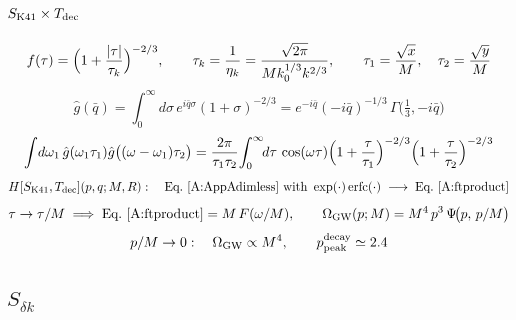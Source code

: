 \documentclass[10pt,prd,aps,nobibnotes,superscriptaddress,preprintnumbers,notitlepage]{revtex4-1}
\newcommand{\Omgw}{\Omega_{\rm GW}}
\begin{document}
\subsection{\texorpdfstring{$S_{\rm K41}\times T_{\rm dec}$}{S\_K41 x T\_dec}}
\label{sec:chain-k41dec}

\begin{equation}
  f(\tau)=\Bigl(1+\frac{|\tau|}{\tau_k}\Bigr)^{-2/3},
  \qquad
  \tau_k=\frac{1}{\eta_k}=\frac{\sqrt{2\pi}}{M k_0^{1/3}k^{2/3}},
  \qquad
  \tau_1=\frac{\sqrt{x}}{M},\quad \tau_2=\frac{\sqrt{y}}{M}
  \label{A:decf}
\end{equation}
\begin{equation}
  \hat g(\bar q)=\!\int_0^{\infty}\!\!d\sigma\,e^{i\bar q\sigma}(1+\sigma)^{-2/3}
  =e^{-i\bar q}(-i\bar q)^{-1/3}\,\Gamma\!\bigl(\tfrac13,-i\bar q\bigr)
  \label{A:ghat}
\end{equation}
\begin{equation}
  \int\!d\omega_1\,\hat g(\omega_1\tau_1)\hat g\bigl((\omega-\omega_1)\tau_2\bigr)
  =\frac{2\pi}{\tau_1\tau_2}\!\int_0^{\infty}\!\!d\tau\,\cos(\omega\tau)
  \Bigl(1+\frac{\tau}{\tau_1}\Bigr)^{-2/3}\Bigl(1+\frac{\tau}{\tau_2}\Bigr)^{-2/3}
  \label{A:ftproduct}
\end{equation}
\begin{equation}
  H[S_{\rm K41},T_{\rm dec}](p,q;M,R):\quad
  \text{Eq.~\eqref{A:AppAdimless} with }
  \exp(\cdot)\operatorname{erfc}(\cdot)\;\longrightarrow\;\text{Eq.~\eqref{A:ftproduct}}
  \label{A:Hk41dec}
\end{equation}
\begin{equation}
  \tau\to\tau/M
  \;\Longrightarrow\;
  \text{Eq.~\eqref{A:ftproduct}}=M\,F(\omega/M),
  \qquad
  \Omgw(p;M)=M^4\,p^3\,\Psi\!\bigl(p,\,p/M\bigr)
  \label{A:decamp}
\end{equation}
\begin{equation}
  p/M\to0:\quad \Omgw\propto M^4,
  \qquad
  p_{\rm peak}^{\rm decay}\simeq2.4
  \label{A:decpeak}
\end{equation}

\subsection{\texorpdfstring{$S_{\delta k}$}{S\_dk}}
\label{sec:chain-deltak}
\end{document}
